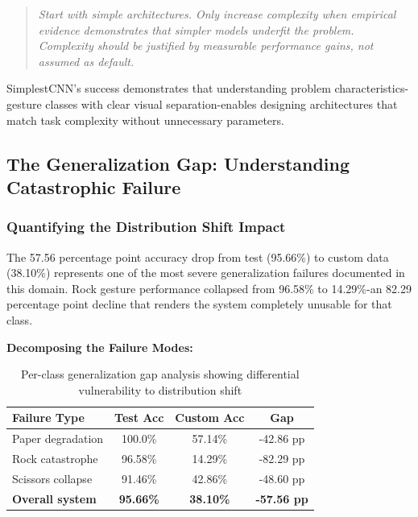 \documentclass[12pt,a4paper]{article}
\begin{document}
\begin{quotation}
\textit{Start with simple architectures. Only increase complexity when empirical evidence demonstrates that simpler models underfit the problem. Complexity should be justified by measurable performance gains, not assumed as default.}
\end{quotation}

SimplestCNN's success demonstrates that understanding problem characteristics-gesture classes with clear visual separation-enables designing architectures that match task complexity without unnecessary parameters.

\subsection{The Generalization Gap: Understanding Catastrophic Failure}

\subsubsection{Quantifying the Distribution Shift Impact}

The 57.56 percentage point accuracy drop from test (95.66\%) to custom data (38.10\%) represents one of the most severe generalization failures documented in this domain. Rock gesture performance collapsed from 96.58\% to 14.29\%-an 82.29 percentage point decline that renders the system completely unusable for that class.

\textbf{Decomposing the Failure Modes:}

\begin{table}[H]
\centering
\begin{tabular}{lccc}
\toprule
\textbf{Failure Type} & \textbf{Test Acc} & \textbf{Custom Acc} & \textbf{Gap} \\
\midrule
Paper degradation & 100.0\% & 57.14\% & -42.86 pp \\
Rock catastrophe & 96.58\% & 14.29\% & -82.29 pp \\
Scissors collapse & 91.46\% & 42.86\% & -48.60 pp \\
\midrule
\textbf{Overall system} & \textbf{95.66\%} & \textbf{38.10\%} & \textbf{-57.56 pp} \\
\bottomrule
\end{tabular}
\caption{Per-class generalization gap analysis showing differential vulnerability to distribution shift}
\label{tab:generalization_gap}
\end{table}
\end{document}
